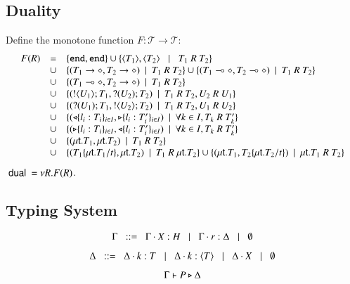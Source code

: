 \subsection{Duality}

\begin{definition}
Define the monotone function $F: \mathcal{T} \longrightarrow \mathcal{T}$:
%
\[
	\begin{array}{rcl}
		F(R)	& = &	\set{\tinact, \tinact}
			\cup	\set{\chtype{T_1}, \chtype{T_2} \bnfbar T_1\ R\ T_2}\\
			&\cup&	\set{(T_1 \sharedop \diamond, T_2 \sharedop \diamond) \setbar T_1\ R\ T_2}
			\cup	\set{(T_1 \lollipop \diamond, T_2 \lollipop \diamond) \setbar T_1\ R\ T_2}\\
			&\cup&	\set{(T_1 \lollipop \diamond, T_2 \sharedop \diamond) \setbar T_1\ R\ T_2}\\
			&\cup&	\set{(\btout{U_1} T_1, \btinp{U_2} T_2) \setbar T_1\ R\ T_2, U_2\ R\ U_1}\\
			&\cup&	\set{(\btinp{U_1} T_1, \btout{U_2} T_2) \setbar T_1\ R\ T_2, U_1\ R\ U_2}\\
			&\cup&	\set{(\btsel{l_i: T_i}_{i \in I}, \btbra{l_i: T'_i}_{i \in I}) \setbar \forall k \in I, T_k\ R\ T'_k}\\
			&\cup&	\set{(\btbra{l_i: T_i}_{i \in I}, \btsel{l_i: T'_i}_{i \in I}) \setbar \forall k \in I, T_k\ R\ T'_k}\\
			&\cup&	\set{(\trec{t} T_1, \trec{t} T_2) \setbar T_1\ R\ T_2}\\
			&\cup&	\set{(T_1\subst{\trec{t} T_1}{t}, \trec{t}{T_2}) \setbar T_1\ R\ \trec{t} T_2}
			\cup	\set{(\trec{t}{T_1}, T_2\subst{\trec{t} T_2}{t}) \setbar \trec{t} T_1\ R\ T_2}\\
	\end{array}
\]
%
$\ \mathsf{dual}\  = \nu R.F(R)$.
\end{definition}

\subsection{Typing System}

\[
	\Gamma \;\;::=\;\; \Gamma \cdot X: H \;\;\;|\;\;\; \Gamma \cdot r:\Delta \;\;\;|\;\;\; \emptyset
\]

\[
	\Delta \;\;::=\;\; \Delta \cdot k:T \;\;\;|\;\;\; \Delta \cdot k: \langle T \rangle \;\;\;|\;\;\; \Delta \cdot X \;\;\;|\;\;\; \emptyset
\]

\[
	\Gamma \vdash P \triangleright \Delta
\]


%

